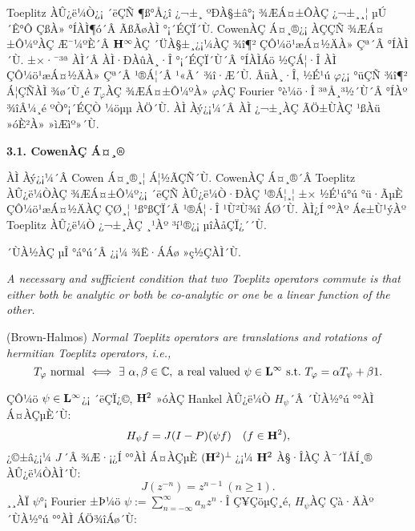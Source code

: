 \documentclass[12pt,a4paper,2sided]{article}
\newcommand{\vs}{\vspace}
\begin{document}
\newpage
{}
\vspace{.8 cm}


\noindent  Toeplitz ÀÛ¿ë¼Ò¿¡ ´ëÇÑ ¶ß°Å¿î ¿¬±¸ ºÐÀ§±â°¡ ¾ÆÁ¤±ÔÀÇ
¿¬±¸¸¦ µÚ´Ê°Ô ÇßÀ» °ÍÀÌ¶ó´Â ÃßÃøÀÌ °¡´ÉÇÏ´Ù. CowenÀÇ Á¤¸®¿¡ ÀÇÇÑ
¾ÆÁ¤±Ô¼ºÀÇ Æ¯¼ºÈ­´Â $\bold H^{\infty}$ÀÇ ´ÜÀ§±¸¿¡¼­ÀÇ ¾î¶²
ÇÔ¼ö¹æÁ¤½ÄÀ» Çª´Â °ÍÀÌ´Ù. ±×·¯³ª ÀÌ´Â ÀÌ·ÐÀûÀ¸·Î °¡´ÉÇÏ´Ù´Â °ÍÀÌÁö
½ÇÁ¦·Î ÀÌ ÇÔ¼ö¹æÁ¤½ÄÀ» Çª´Â ¹®Á¦´Â ¹«Ã´ ¾î·Æ´Ù. ÂüÀ¸·Î, ½É¹ú
$\varphi$¿¡ °üÇÑ ¾î¶² Á¦ÇÑÀÌ ¾ø´Ù¸é $T_{\varphi}$ÀÇ ¾ÆÁ¤±Ô¼ºÀ»
$\varphi$ÀÇ Fourier °è¼ö·Î ³ªÅ¸³½´Ù´Â °ÍÀº ¾îÂ¼¸é ºÒ°¡´ÉÇÒ ¼öµµ
ÀÖ´Ù. ÀÌ Àý¿¡¼­´Â ÀÌ ¿¬±¸ÀÇ ÃÖ±ÙÀÇ ¹ßÀü »óÈ²À» »ìÆìº»´Ù.

\vspace{.3 cm} {\bf 3.1. CowenÀÇ Á¤¸®} \vspace{.3 cm}

ÀÌ Àý¿¡¼­´Â Cowen Á¤¸®¸¦ Á¦½ÃÇÑ´Ù. CowenÀÇ Á¤¸®´Â Toeplitz ÀÛ¿ë¼ÒÀÇ
¾ÆÁ¤±Ô¼º¿¡ ´ëÇÑ ÀÛ¿ë¼Ò·ÐÀÇ ¹®Á¦¸¦ ±× ½É¹ú°ú °ü·ÃµÈ ÇÔ¼ö¹æÁ¤½ÄÀÇ ÇØ¸¦
¹ß°ßÇÏ´Â ¹®Á¦·Î ¹Ù²Ù¾î ÁØ´Ù. ÀÌ¿Í °°Àº Á¢±Ù¹ýÀº Toeplitz ÀÛ¿ë¼Ò
¿¬±¸ÀÇ ¸¹Àº ³í¹®¿¡ µîÀåÇÏ¿´´Ù.

\vs{0.3cm} ´ÙÀ½ÀÇ µÎ °á°ú´Â \cite{BH}¿¡¼­ ¾Ë·ÁÁø »ç½ÇÀÌ´Ù.

\vs{0.3cm}{\bf Lemma 3.1.1.} {\sl A necessary and sufficient
condition that two Toeplitz operators commute is that either both be
analytic or both be co-analytic or one be a linear function of the
other.}

\vs{0.3cm}{\bf Theorem 3.1.2.} {\rm(Brown-Halmos) \cite{BH}} {\sl
Normal Toeplitz operators are translations and rotations of
hermitian Toeplitz operators, i.e.,
$$
T_\varphi\ \mbox{normal}\ \Longleftrightarrow\ \exists\ \alpha,\beta\in\mathbb{C},
\ \mbox{a real valued}\ \psi\in {\bold L}^{\infty}\ \mbox{s.t.}\
T_{\varphi}=\alpha T_{\psi} +\beta 1.
$$}

ÇÔ¼ö $\psi\in{\bold L}^{\infty}$¿¡ ´ëÇÏ¿©, ${\bold H}^2$ »óÀÇ Hankel
ÀÛ¿ë¼Ò $H_\psi$´Â ´ÙÀ½°ú °°ÀÌ Á¤ÀÇµÈ´Ù:
$$
H_{\psi}f=J(I-P)(\psi f)\quad (f\in {\bold H}^{2}),
$$
¿©±â¿¡¼­ $J$\,´Â ¾Æ·¡¿Í °°ÀÌ Á¤ÀÇµÈ $({{\bold H}^2})^{\perp}$\,¿¡¼­
${\bold H}^2$ À§·ÎÀÇ À¯´ÏÅÍ¸® ÀÛ¿ë¼ÒÀÌ´Ù:
$$
J(z^{-n})=z^{n-1}\ (n\ge 1).
$$
\medskip
¸¸ÀÏ $\psi$°¡ Fourier ±Þ¼ö $\psi:=\sum_{n=-\infty}^{\infty}a_n
z^n$·Î Ç¥ÇöµÇ¸é, $H_\psi$ÀÇ Çà·ÄÀº ´ÙÀ½°ú °°ÀÌ ÁÖ¾îÁø´Ù:

\bigskip\bigskip

\newpage\leftline{\large{\it 180}\ \ \ \small ÇÐ¹® ¿¬±¸ÀÇ
µ¿Çâ°ú ÀïÁ¡ -- ¼öÇÐ}  \vspace{0.3cm}
\end{document}
